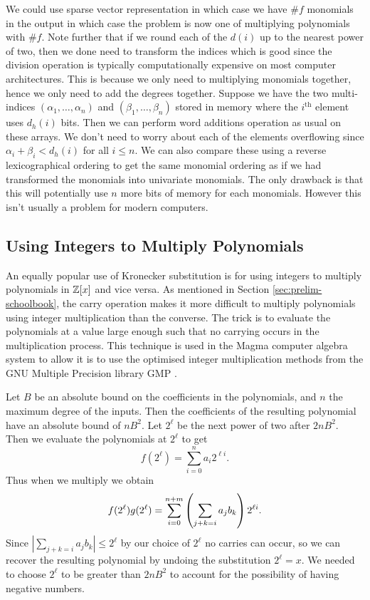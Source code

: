 We could use sparse vector representation in which case we have $\# f$ monomials in the output in which case the problem is now one of multiplying polynomials with $\# f$. Note further that if we round each of the $d(i)$ up to the nearest power of two, then we done need to transform the indices which is good since the division operation is typically computationally expensive on most computer architectures. This is because we only need to multiplying monomials together, hence we only need to add the degrees together. Suppose we have the two multi-indices $(\alpha_1, \ldots, \alpha_n)$ and $(\beta_1, \ldots, \beta_n)$ stored in memory where the $i^{\text{th}}$ element uses $d_h(i)$ bits. Then we can perform word additions operation as usual on these arrays. We don't need to worry about each of the elements overflowing since $\alpha_i + \beta_i < d_h(i)$ for all $i \le n$. We can also compare these using a reverse lexicographical ordering to get the same monomial ordering as if we had transformed the monomials into univariate monomials. The only drawback is that this will potentially use $n$ more bits of memory for each monomials. However this isn't usually a problem for modern computers.

\medskip

\subsection{Using Integers to Multiply Polynomials}%
\label{sub:Using Integers to multiply Polynomials}

An equally popular use of Kronecker substitution is for using integers to multiply polynomials in ${\mathbb Z}[x]$ and vice versa. As mentioned in Section \ref{sec:prelim-schoolbook}, the carry operation makes it more difficult to multiply polynomials using integer multiplication than the converse. The trick is to evaluate the polynomials at a value large enough such that no carrying occurs in the multiplication process. This technique is used in the Magma computer algebra system to allow it is to use the optimised integer multiplication methods from the GNU Multiple Precision library GMP \cite{magma}.

Let $B$ be an absolute bound on the coefficients in the polynomials, and $n$ the maximum degree of the inputs. Then the coefficients of the resulting polynomial have an absolute bound of $nB^2$. Let $2^\ell$ be the next power of two after $2nB^2$. Then we evaluate the polynomials at $2^\ell$ to get
\[
    f(2^\ell) = \sum^n_{i = 0} a_i 2^{\ell i}.
\]
Thus when we multiply we obtain
\[
    f(2^\ell)g(2^\ell) = \sum^{n+m}_{i=0} \left(\sum_{j + k = i} a_jb_k\right)2^{\ell i}.
\]
Since $|\sum_{j + k = i}a_j b_k| \leq 2^{\ell}$ by our choice of $2^\ell$ no carries can occur, so we can recover the resulting polynomial by undoing the substitution $2^\ell = x$. We needed to choose $2^\ell$ to be greater than $2nB^2$ to account for the possibility of having negative numbers.

